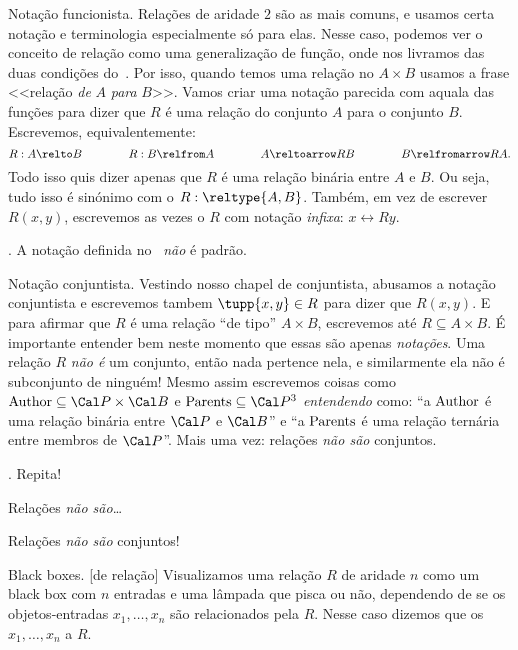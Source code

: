 \note Notação funcionista.
\label{funlike_notation_for_relations}%
Relações de aridade $2$ são as mais comuns, e usamos certa notação
e terminologia especialmente só para elas.
Nesse caso, podemos ver o conceito de relação como uma generalização de função,
onde nos livramos das duas condições do~.
Por isso, quando temos uma relação no $A\times B$
usamos a frase <<relação \emph{de} $A$ \emph{para} $B$>>.
Vamos criar uma notação parecida com aquala das funções para dizer que $R$
é uma relação do conjunto $A$ para o conjunto $B$.
Escrevemos, equivalentemente:
$$
R : A \relto B
\qqqquad
R : B \relfrom A
\qqqquad
A \reltoarrow R B
\qqqquad
B \relfromarrow R A.
$$
Todo isso quis dizer apenas que $R$ é uma relação binária entre $A$ e $B$.
Ou seja, tudo isso é sinónimo com o $R : \reltype{A,B}$.
Também, em vez de escrever $R(x,y)$, escrevemos as vezes
o $R$ com notação \emph{infixa}: $x \rel R y$.

\beware.
A notação definida no~
\emph{não} é padrão.

\note Notação conjuntista.
\label{setlike_notation_for_relations}%
Vestindo nosso chapel de conjuntista, abusamos a notação conjuntista e escrevemos
tambem $\tupp{x,y} \in R$ para dizer que $R(x,y)$.
E para afirmar que $R$ é uma relação ``de tipo'' $A\times B$, escrevemos
até $R \subseteq A\times B$.
É importante entender bem neste momento que essas são apenas
\emph{notações}.  Uma relação $R$ \emph{não é} um conjunto, então nada pertence nela,
e similarmente ela não é subconjunto de ninguém!
Mesmo assim escrevemos coisas como
$\namedpred{Author} \subseteq \cal P \times \cal B$
e
$\namedpred{Parents} \subseteq \cal P^3$
\emph{entendendo} como: ``a $\mathop{\rm Author}\nolimits$ é uma relação binária
entre $\cal P$ e $\cal B$'' e ``a $\mathop{\rm Parents}\nolimits$ é uma relação
ternária entre membros de $\cal P$''.
Mais uma vez: relações \emph{não são} conjuntos.

\exercise.
\label{repeat_after_me_relations_are_not_sets}%
Repita!

\hint
Relações \emph{não são}\dots

\solution
Relações \emph{não são} conjuntos!

\endexercise

\note Black boxes.
\label{blackbox_rel}%
[de relação]%
%
Visualizamos uma relação $R$ de aridade $n$ como um black box com $n$ entradas
e uma lâmpada que pisca ou não, dependendo de se os objetos-entradas
$x_1,\dotsc,x_n$ são relacionados pela $R$.
Nesse caso dizemos que os $x_1,\dotsc,x_n$  a $R$.

